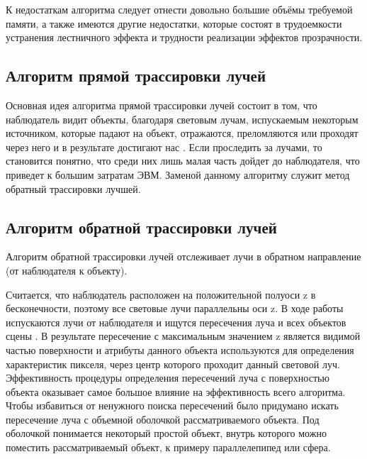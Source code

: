 К недостаткам алгоритма следует отнести довольно большие объёмы требуемой памяти, а также имеются другие недостатки, которые состоят в трудоемкости устранения лестничного эффекта и трудности реализации эффектов прозрачности.

\subsection{Алгоритм прямой трассировки лучей}

Основная идея алгоритма прямой трассировки лучей состоит в том, что наблюдатель видит объекты, благодаря световым лучам, испускаемым некоторым источником, которые падают на объект, отражаются, преломляются или проходят через него и в результате достигают нас \cite{bib4}. Если проследить за лучами, то становится понятно, что среди них лишь малая часть дойдет до наблюдателя, что приведет к большим затратам ЭВМ. Заменой данному алгоритму служит метод обратный трассировки лучшей.

\subsection{Алгоритм обратной трассировки лучей}

Алгоритм обратной трассировки лучей отслеживает лучи в обратном направление (от наблюдателя к объекту). 

Считается, что наблюдатель расположен на положительной полуоси z в бесконечности, поэтому все световые лучи параллельны оси z. В ходе работы испускаются лучи от наблюдателя и ищутся пересечения луча и всех объектов сцены \cite{bib5}. В результате пересечение с максимальным значением z является видимой частью поверхности и атрибуты данного объекта используются для определения характеристик пикселя, через центр которого проходит данный световой луч. Эффективность процедуры определения пересечений луча с поверхностью объекта оказывает самое большое влияние на эффективность всего алгоритма. Чтобы избавиться от ненужного поиска пересечений было придумано искать пересечение луча с объемной оболочкой рассматриваемого объекта. Под оболочкой понимается некоторый простой объект, внутрь которого можно поместить рассматриваемый объект, к примеру параллелепипед или сфера.

\begin{figure}[ht!]
\end{figure}

